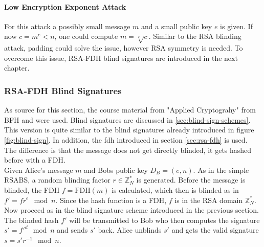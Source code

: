 \paragraph{Low Encryption Exponent Attack}
For this attack a possibly small message $m$ and a small public key $e$ is given.
If now $c = m^e < n$, one could compute $ m = \sqrt[e]{c} $.
Similar to the RSA blinding attack, padding could solve the issue, however RSA symmetry is needed.
To overcome this issue, RSA-FDH blind signatures are introduced in the next chapter.

\subsubsection{RSA-FDH Blind Signatures}
As source for this section, the course material from "Applied Cryptograhy" from BFH and \cite{chaum:blind-sign} were used.
\label{sec:blind-sign-fdh}
Blind signatures are discussed in \ref{sec:blind-sign-schemes}.
This version is quite similar to the blind signatures already introduced in figure \ref{fig:blind-sign}.
In addition, the \gls{fdh} introduced in section \ref{sec:rsa-fdh} is used.
The difference is that the message does not get directly blinded, it gets hashed before with a \acl{FDH}.
\\Given Alice's message $m$ and Bobs public key $D_B = (e,n)$.
As in the simple \gls{RSABS}, a random blinding factor $r\in \mathbb{Z}_N^*$ is generated.
Before the message is blinded, the \acl{FDH} $ f = \text{FDH}(m)$ is calculated, which then is blinded as in $f' = fr^e \mod n$.
Since the hash function is a \acl{FDH}, $f$ is in the RSA domain $\mathbb{Z}_N^*$.
Now proceed as in the blind signature scheme introduced in the previous section.
The blinded hash $f'$ will be transmitted to Bob who then computes the signature $s' = f'^d \mod n$ and sends $s'$ back.
Alice unblinds $s'$ and gets the valid signature $s = s'r^{-1} \mod n$.

